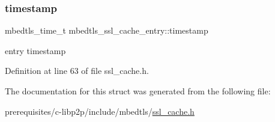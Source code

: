 \subsubsection{\texorpdfstring{timestamp}{timestamp}}
{\footnotesize\ttfamily mbedtls\+\_\+time\+\_\+t mbedtls\+\_\+ssl\+\_\+cache\+\_\+entry\+::timestamp}

entry timestamp 

Definition at line 63 of file ssl\+\_\+cache.\+h.



The documentation for this struct was generated from the following file\+:\begin{DoxyCompactItemize}
\item 
prerequisites/c-\/libp2p/include/mbedtls/\mbox{\hyperlink{ssl__cache_8h}{ssl\+\_\+cache.\+h}}\end{DoxyCompactItemize}
